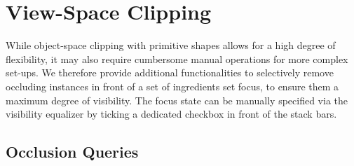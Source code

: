 \section{View-Space Clipping}

While object-space clipping with primitive shapes allows for a high degree of flexibility, it may also require cumbersome manual operations for more complex set-ups.
We therefore provide additional functionalities to selectively remove occluding instances in front of a set of ingredients set focus, to ensure them a maximum degree of visibility.
The focus state can be manually specified via the visibility equalizer by ticking a dedicated checkbox in front of the stack bars.

\subsection{Occlusion Queries}
\label{sec:OQ}

